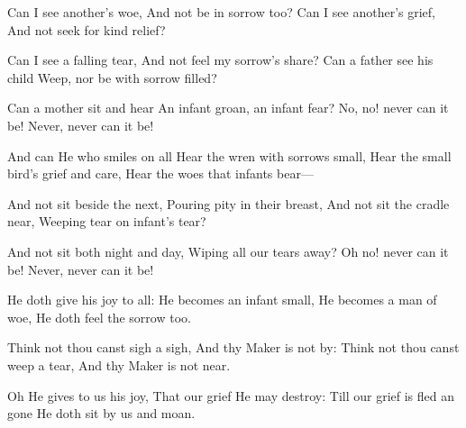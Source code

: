 
\begin{poem}

\begin{stanza}
Can I see another's woe,\verseline
And not be in sorrow too?\verseline
Can I see another's grief,\verseline
And not seek for kind relief?
\end{stanza}
\begin{stanza}
\verseindent Can I see a falling tear,\verseline
And not feel my sorrow's share?\verseline
Can a father see his child\verseline
Weep, nor be with sorrow filled?
\end{stanza}
\begin{stanza}
\verseindent Can a mother sit and hear\verseline
An infant groan, an infant fear?\verseline
No, no! never can it be!\verseline
Never, never can it be!
\end{stanza}
\begin{stanza}
\verseindent And can He who smiles on all\verseline
Hear the wren with sorrows small,\verseline
Hear the small bird's grief and care,\verseline
Hear the woes that infants bear—
\end{stanza}
\begin{stanza}
\verseindent And not sit beside the next,\verseline
Pouring pity in their breast,\verseline
And not sit the cradle near,\verseline
Weeping tear on infant's tear?
\end{stanza}
\begin{stanza}
\verseindent And not sit both night and day,\verseline
Wiping all our tears away?\verseline
Oh no! never can it be!\verseline
Never, never can it be!
\end{stanza}
\begin{stanza}
\verseindent He doth give his joy to all:\verseline
He becomes an infant small,\verseline
He becomes a man of woe,\verseline
He doth feel the sorrow too.
\end{stanza}
\begin{stanza}
\verseindent Think not thou canst sigh a sigh,\verseline
And thy Maker is not by:\verseline
Think not thou canst weep a tear,\verseline
And thy Maker is not near.
\end{stanza}
\begin{stanza}
\verseindent Oh He gives to us his joy,\verseline
That our grief He may destroy:\verseline
Till our grief is fled an gone\verseline
He doth sit by us and moan.
\end{stanza}

\end{poem}